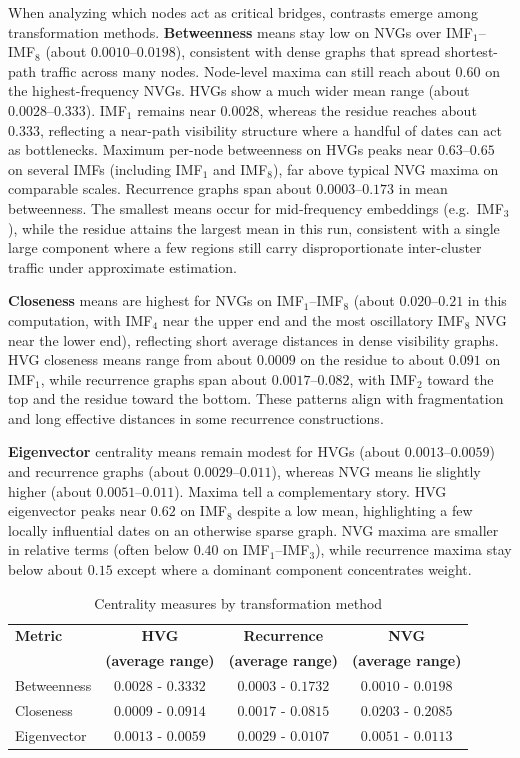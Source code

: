 \documentclass[11pt,a4paper]{article}
\begin{document}
When analyzing which nodes act as critical bridges, contrasts emerge among transformation methods. \textbf{Betweenness} means stay low on NVGs over IMF$_1$--IMF$_8$ (about $0.0010$--$0.0198$), consistent with dense graphs that spread shortest-path traffic across many nodes. Node-level maxima can still reach about $0.60$ on the highest-frequency NVGs. HVGs show a much wider mean range (about $0.0028$--$0.333$). IMF$_1$ remains near $0.0028$, whereas the residue reaches about $0.333$, reflecting a near-path visibility structure where a handful of dates can act as bottlenecks. Maximum per-node betweenness on HVGs peaks near $0.63$--$0.65$ on several IMFs (including IMF$_1$ and IMF$_8$), far above typical NVG maxima on comparable scales. Recurrence graphs span about $0.0003$--$0.173$ in mean betweenness. The smallest means occur for mid-frequency embeddings (e.g.\ IMF$_3$), while the residue attains the largest mean in this run, consistent with a single large component where a few regions still carry disproportionate inter-cluster traffic under approximate estimation.

\textbf{Closeness} means are highest for NVGs on IMF$_1$--IMF$_8$ (about $0.020$--$0.21$ in this computation, with IMF$_4$ near the upper end and the most oscillatory IMF$_8$ NVG near the lower end), reflecting short average distances in dense visibility graphs. HVG closeness means range from about $0.0009$ on the residue to about $0.091$ on IMF$_1$, while recurrence graphs span about $0.0017$--$0.082$, with IMF$_2$ toward the top and the residue toward the bottom. These patterns align with fragmentation and long effective distances in some recurrence constructions.

\textbf{Eigenvector} centrality means remain modest for HVGs (about $0.0013$--$0.0059$) and recurrence graphs (about $0.0029$--$0.011$), whereas NVG means lie slightly higher (about $0.0051$--$0.011$). Maxima tell a complementary story. HVG eigenvector peaks near $0.62$ on IMF$_8$ despite a low mean, highlighting a few locally influential dates on an otherwise sparse graph. NVG maxima are smaller in relative terms (often below $0.40$ on IMF$_1$--IMF$_3$), while recurrence maxima stay below about $0.15$ except where a dominant component concentrates weight.

\begin{table}[h]
\centering
\caption{Centrality measures by transformation method}
\label{tab:centralidad}
\small
\begin{tabular}{lccc}
\toprule
\textbf{Metric} & \textbf{HVG} & \textbf{Recurrence} & \textbf{NVG} \\
 & \textbf{(average range)} & \textbf{(average range)} & \textbf{(average range)} \\
\midrule
Betweenness & $0.0028$ - $0.3332$ & $0.0003$ - $0.1732$ & $0.0010$ - $0.0198$ \\
Closeness & $0.0009$ - $0.0914$ & $0.0017$ - $0.0815$ & $0.0203$ - $0.2085$ \\
Eigenvector & $0.0013$ - $0.0059$ & $0.0029$ - $0.0107$ & $0.0051$ - $0.0113$ \\
\bottomrule
\end{tabular}
\end{table}
\end{document}
